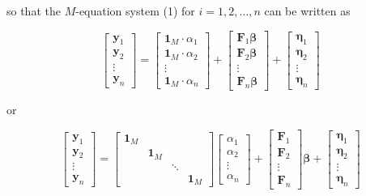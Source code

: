 \documentclass[10pt]{article}
\begin{document}
so that the $M$-equation system (1) for $i=1,2, \ldots, n$ can be written as

$$
\left[\begin{array}{c}
\mathbf{y}_{1} \\
\mathbf{y}_{2} \\
\vdots \\
\mathbf{y}_{n}
\end{array}\right]=\left[\begin{array}{c}
\mathbf{1}_{M} \cdot \alpha_{1} \\
\mathbf{1}_{M} \cdot \alpha_{2} \\
\vdots \\
\mathbf{1}_{M} \cdot \alpha_{n}
\end{array}\right]+\left[\begin{array}{c}
\mathbf{F}_{1} \boldsymbol{\beta} \\
\mathbf{F}_{2} \boldsymbol{\beta} \\
\vdots \\
\mathbf{F}_{n} \boldsymbol{\beta}
\end{array}\right]+\left[\begin{array}{c}
\boldsymbol{\eta}_{1} \\
\boldsymbol{\eta}_{2} \\
\vdots \\
\boldsymbol{\eta}_{n}
\end{array}\right]
$$

or

$$
\left[\begin{array}{c}
\mathbf{y}_{1} \\
\mathbf{y}_{2} \\
\vdots \\
\mathbf{y}_{n}
\end{array}\right]=\left[\begin{array}{llll}
\mathbf{1}_{M} & & & \\
& \mathbf{1}_{M} & & \\
& & \ddots & \\
& & & \mathbf{1}_{M}
\end{array}\right]\left[\begin{array}{c}
\alpha_{1} \\
\alpha_{2} \\
\vdots \\
\alpha_{n}
\end{array}\right]+\left[\begin{array}{c}
\mathbf{F}_{1} \\
\mathbf{F}_{2} \\
\vdots \\
\mathbf{F}_{n}
\end{array}\right] \boldsymbol{\beta}+\left[\begin{array}{c}
\boldsymbol{\eta}_{1} \\
\boldsymbol{\eta}_{2} \\
\vdots \\
\boldsymbol{\eta}_{n}
\end{array}\right]
$$
\end{document}
